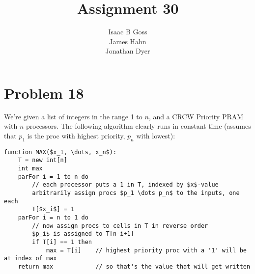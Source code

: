 \documentclass{article}
\author{Isaac B Goss\\ James Hahn\\ Jonathan Dyer}
\title{Assignment 30}
\providecommand{\prob}[1]{\section*{Problem #1}}
\begin{document}
\maketitle
\prob{18}
We're given a list of integers in the range 1 to $n$, and a CRCW Priority PRAM with $n$ processors. The following algorithm clearly runs in constant time (assumes that $p_1$ is the proc with highest priority, $p_n$ with lowest):
\begin{lstlisting}
function MAX($x_1, \dots, x_n$):
    T = new int[n]
    int max
    parFor i = 1 to n do
        // each processor puts a 1 in T, indexed by $x$-value
        arbitrarily assign procs $p_1 \dots p_n$ to the inputs, one each
        T[$x_i$] = 1
    parFor i = n to 1 do
        // now assign procs to cells in T in reverse order
        $p_i$ is assigned to T[n-i+1]
        if T[i] == 1 then
            max = T[i]    // highest priority proc with a '1' will be at index of max
    return max            // so that's the value that will get written
\end{lstlisting}
\end{document}
